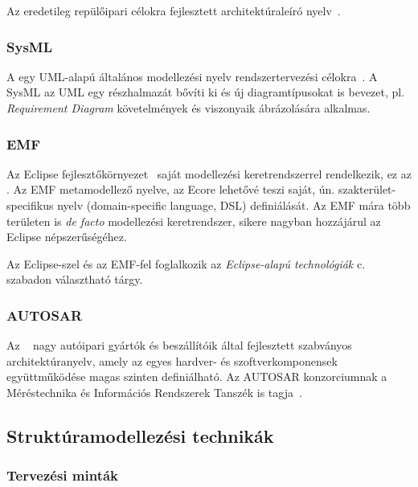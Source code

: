 Az  eredetileg repülőipari célokra fejlesztett architektúraleíró nyelv~\cite{AADL}.

\subsubsection{SysML}

A  egy UML-alapú általános modellezési nyelv rendszertervezési célokra~\cite{SysML}. A SysML az UML egy részhalmazát bővíti ki és új diagramtípusokat is bevezet, pl. \emph{Requirement Diagram} követelmények és viszonyaik ábrázolására alkalmas.

\subsubsection{EMF}

Az Eclipse fejlesztőkörnyezet~\cite{eclipse} saját modellezési keretrendszerrel rendelkezik, ez az . Az EMF metamodellező nyelve, az Ecore lehetővé teszi saját, ún. szakterület-specifikus nyelv (domain-specific language, DSL) definiálását. Az EMF mára több területen is \emph{de facto} modellezési keretrendszer, sikere nagyban hozzájárul az Eclipse népszerűségéhez.

Az Eclipse-szel és az EMF-fel foglalkozik az \emph{Eclipse-alapú technológiák} c. szabadon választható tárgy.

\subsubsection{AUTOSAR}

Az ~\cite{autosar} nagy autóipari gyártók és beszállítóik által fejlesztett szabványos architektúranyelv, amely az egyes hardver- és szoftverkomponensek együttműködése magas szinten definiálható. Az AUTOSAR konzorciumnak a Méréstechnika és Információs Rendszerek Tanszék is tagja~\cite{autosar-attendees}.

\subsection{Struktúramodellezési technikák}



\subsubsection{Tervezési minták}


